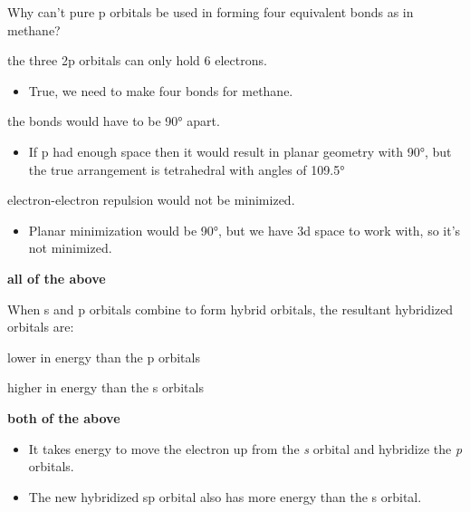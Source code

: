\documentclass[12pt,a4paper]{article}
\begin{document}
\begin{enumerate}
\begin{itemize}
\begin{itemize}
                \end{itemize}
        \end{itemize}
    {\color{G-Moon}\item Why can't pure p orbitals be used in forming four equivalent bonds as in methane?}
        \begin{itemize}
            {\color{G-Moon}\item the three 2p orbitals can only hold 6 electrons.}
                \begin{itemize}
                    \item True, we need to make four bonds for methane.
                \end{itemize}
                {\color{G-Moon}\item the bonds would have to be \ang{90} apart.}
                \begin{itemize}
                    \item If p had enough space then it would result in planar geometry with \ang{90}, but the true arrangement is tetrahedral with angles of \ang{109.5}
                \end{itemize}
                {\color{G-Moon}\item electron-electron repulsion would not be minimized.}
                \begin{itemize}
                    \item Planar minimization would be \ang{90}, but we have 3d space to work with, so it's not minimized.
                \end{itemize}
            \item {\color{o-Sun}\textbf{all of the above}}
        \end{itemize}
    {\color{G-Moon}\item When s and p orbitals combine to form hybrid orbitals, the resultant hybridized orbitals are:}
        \begin{itemize}
           {\color{G-Moon}\item lower in energy than the p orbitals
            \item higher in energy than the s orbitals}
            \item {\color{o-Sun}\textbf{both of the above}}
                \begin{itemize}
                    \item It takes energy to move the electron up from the \textit{s} orbital and hybridize the \textit{p} orbitals. 
                    \item The new hybridized sp orbital also has more energy than the s orbital.

\end{itemize}
\end{itemize}
\end{enumerate}
\end{document}
